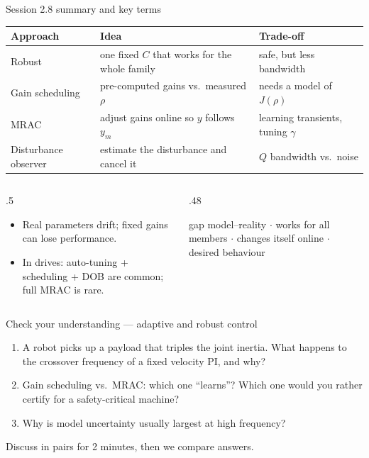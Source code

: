 \documentclass[aspectratio=169,10pt]{beamer}
\begin{document}
\begin{frame}{Session 2.8 summary and key terms}
\small
\begin{tabularx}{\textwidth}{@{}l X X@{}}
\toprule
\textbf{Approach} & \textbf{Idea} & \textbf{Trade-off}\\
\midrule
Robust & one fixed $C$ that works for the whole family & safe, but less bandwidth\\
Gain scheduling & pre-computed gains vs.\ measured $\rho$ & needs a model of $J(\rho)$\\
MRAC & adjust gains online so $y$ follows $y_m$ & learning transients, tuning $\gamma$\\
Disturbance observer & estimate the disturbance and cancel it & $Q$ bandwidth vs.\ noise\\
\bottomrule
\end{tabularx}
\vspace{2mm}
\begin{columns}[T]
\begin{column}{.5\textwidth}
\begin{keybox}
\begin{itemize}\setlength\itemsep{.3mm}
\item Real parameters drift; fixed gains can lose performance.
\item In drives: auto-tuning + scheduling + DOB are common; full MRAC is rare.
\end{itemize}
\end{keybox}
\end{column}
\begin{column}{.48\textwidth}
\begin{defbox}
 gap model--reality $\cdot$  works for all members $\cdot$  changes itself online $\cdot$  desired behaviour
\end{defbox}
\end{column}
\end{columns}
\end{frame}

\begin{frame}{Check your understanding --- adaptive and robust control}
\begin{keybox}
\begin{enumerate}\setlength\itemsep{2mm}
\item A robot picks up a payload that triples the joint inertia. What happens to the crossover frequency of a fixed velocity PI, and why?
\item Gain scheduling vs.\ MRAC: which one ``learns''? Which one would you rather certify for a safety-critical machine?
\item Why is model uncertainty usually largest at high frequency?
\end{enumerate}
\end{keybox}
\vspace{2mm}
{\small\color{mkGray}Discuss in pairs for 2 minutes, then we compare answers.}
\end{frame}
\end{document}
